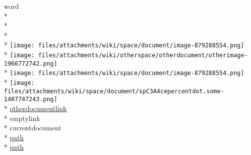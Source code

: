 \documentclass{article}
\begin{document}
word\\*
\\*
\\*
\\*
\texttt{[image: files/attachments/wiki/space/document/image-879288554.png]}\\*
\texttt{[image: files/attachments/wiki/otherspace/otherdocument/otherimage-1966772742.png]}\\*
\texttt{[image: files/attachments/wiki/space/document/image-879288554.png]}\\*
\texttt{[image: files/attachments/wiki/space/document/spC3A4cepercentdot.some-1407747243.png]}\\*
\href{http://test/bin/view/OtherSpace/OtherDocument}{otherdocumentlink}\\*
emptylink\\*
currentdocument\\*
\href{https://localhost:8080/xwiki/whatever}{path}\\*
\href{http://localhost:8080/xwiki/whatever}{path}
\end{document}
